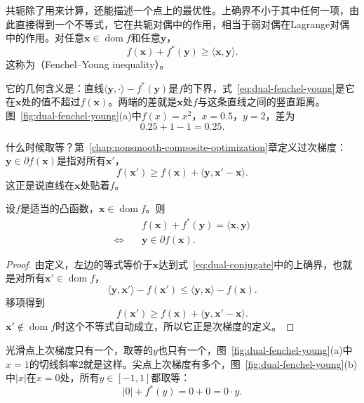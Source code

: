 共轭除了用来计算，还能描述一个点上的最优性。上确界不小于其中任何一项，由此直接得到一个不等式，它在共轭对偶中的作用，相当于弱对偶在Lagrange对偶中的作用。对任意$\bm{x}\in\operatorname{dom}f$和任意$\bm{y}$，
\begin{equation}
 f(\bm{x})+f^*(\bm{y})\geq\langle\bm{x},\bm{y}\rangle.
 \label{eq:dual-fenchel-young}
\end{equation}
这称为（Fenchel--Young inequality）。

它的几何含义是：直线$\langle\bm{y},\cdot\rangle-f^*(\bm{y})$是$f$的下界，式~\eqref{eq:dual-fenchel-young}是它在$\bm{x}$处的值不超过$f(\bm{x})$。两端的差就是$\bm{x}$处$f$与这条直线之间的竖直距离。图~\ref{fig:dual-fenchel-young}(a)中$f(x)=x^2$，$x=0.5$，$y=2$，差为
\[
 0.25+1-1=0.25.
\]

什么时候取等？第~\ref{chap:nonsmooth-composite-optimization}章定义过次梯度：$\bm{y}\in\partial f(\bm{x})$是指对所有$\bm{x}'$，
\[
 f(\bm{x}')\geq f(\bm{x})+\langle\bm{y},\bm{x}'-\bm{x}\rangle.
\]
这正是说直线在$\bm{x}$处贴着$f$。

\begin{theorem}
 \label{thm:dual-fy-equality}
 设$f$是适当的凸函数，$\bm{x}\in\operatorname{dom}f$。则
 \begin{equation}
  \begin{aligned}
   & f(\bm{x})+f^*(\bm{y})=\langle\bm{x},\bm{y}\rangle\\
   \Longleftrightarrow\quad & \bm{y}\in\partial f(\bm{x}).
  \end{aligned}
  \label{eq:dual-fy-equality}
 \end{equation}
\end{theorem}

\begin{proof}
 由定义，左边的等式等价于$\bm{x}$达到式~\eqref{eq:dual-conjugate}中的上确界，也就是对所有$\bm{x}'\in\operatorname{dom}f$，
 \[
  \langle\bm{y},\bm{x}'\rangle-f(\bm{x}')\leq\langle\bm{y},\bm{x}\rangle-f(\bm{x}).
 \]
 移项得到
 \[
  f(\bm{x}')\geq f(\bm{x})+\langle\bm{y},\bm{x}'-\bm{x}\rangle.
 \]
 $\bm{x}'\notin\operatorname{dom}f$时这个不等式自动成立，所以它正是次梯度的定义。
\end{proof}

光滑点上次梯度只有一个，取等的$y$也只有一个，图~\ref{fig:dual-fenchel-young}(a)中$x=1$的切线斜率$2$就是这样。尖点上次梯度有多个，图~\ref{fig:dual-fenchel-young}(b)中$\lvert x\rvert$在$x=0$处，所有$y\in[-1,1]$都取等：
\[
 \lvert0\rvert+f^*(y)=0+0=0\cdot y.
\]

